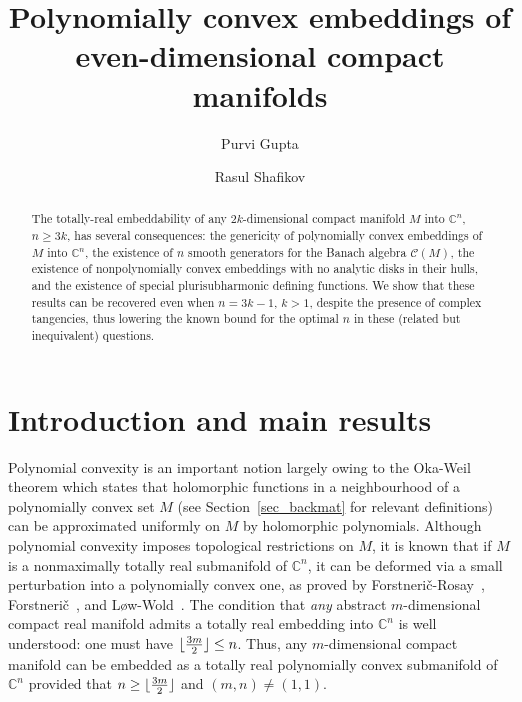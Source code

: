 \documentclass[10pt]{amsart}
\numberwithin{equation}{section}
\theoremstyle{definition}
\theoremstyle{definition}
\theoremstyle{plain}
\DeclarePairedDelimiter\floor{\lfloor}{\rfloor}
\newcommand{\cont}{\mathcal{C}}
\newcommand{\Cn}{\mathbb{C}^n}
\newcommand{\C} {\mathbb{C}}
\begin{document}
\title[Polynomially convex embeddings]{Polynomially convex embeddings of even-dimensional compact manifolds}

\author{Purvi Gupta \and Rasul Shafikov}
\address{Department of Mathematics, Rutgers University\\
New Brunswick, NJ 08854, U.S.A.\\
purvi.gupta@rutgers.edu }

\address{Department of Mathematics, University of Western Ontario\\
Middlesex College,  London, Ontario N6A 5B7, Canada\\
shafikov@uwo.ca}


\begin{abstract} The totally-real embeddability of any $2k$-dimensional compact manifold $M$ into $\C^{n}$, $n\geq 3k$, has several consequences: the genericity of polynomially convex embeddings of $M$ into $\Cn$, the existence of $n$ smooth generators for the Banach algebra $\cont(M)$, the existence of nonpolynomially convex embeddings with no analytic disks in their hulls, and the existence of special plurisubharmonic defining functions. We show that these results can be recovered even when $n=3k-1$, $k>1$, despite the presence of complex tangencies, thus lowering the known bound for the optimal $n$ in these (related but inequivalent) questions. 
\end{abstract}
	

\maketitle


\section{Introduction and main results}\label{sec_intro}

Polynomial convexity is an important notion largely owing to the Oka-Weil theorem which states that holomorphic functions in a neighbourhood 
of a polynomially convex set $M$ (see Section~\ref{sec_backmat} for relevant definitions) can be approximated uniformly on $M$ by holomorphic polynomials. Although polynomial convexity imposes topological restrictions on $M$, it is known that if $M$ is a 
nonmaximally totally real submanifold of $\C^n$,
it can be deformed via a small perturbation into a polynomially convex one, as proved by Forstneri{\v c}-Rosay~\cite{FoRo93}, 
Forstneri{\v c}~\cite{Fo94}, and L\o w-Wold~\cite{LoWo09}. The condition that {\it any} abstract 
$m$-dimensional compact real manifold admits a totally real embedding into $\mathbb C^n$ is well understood: one must have $\floor{\frac{3m}{2}} \le n$. Thus, any $m$-dimensional compact manifold can be embedded as a totally real
polynomially convex submanifold of $\mathbb C^n$ provided that $n\ge \floor{\frac{3m}{2}}$ and $(m,n)\neq (1,1)$. 
  
\end{document}
